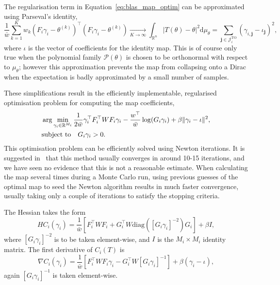 \documentclass[final]{siamltex}
\begin{document}
The regularisation term in Equation~\eqref{eq:blas_map_optim} can be approximated using Parseval's identity,
\[
	\frac{1}{\bar{w}}\sum\limits_{k=1}^K \! w_k
        (F_i\gamma_i-\theta^{(k)})^\top(F_i\gamma_i-\theta^{(k)})
        \xrightarrow[K \to \infty]{}
		\int_{\mathbb{R}^n} |T(\theta)-\theta|^2 \text{d}\mu_\theta =
		\sum\limits_{\mathbf{j}\in\mathcal{J}_i^\text{TO}} (\gamma_{i,\mathbf{j}}-\iota_\mathbf{j})^2,
\]
where $\iota$ is the vector of coefficients for the identity map. This is of course only true when
the polynomial family $\mathcal{P}(\theta)$ is chosen to be orthonormal with respect to $\mu_\theta$; however this
approximation prevents the map from collapsing onto a Dirac when the expectation is badly approximated by a small number of samples.%

These simplifications result in the efficiently implementable, regularised optimisation problem for
computing the map coefficients, 
\begin{align}\label{eq:weighted_map_optim}
	&\arg\min_{\gamma_i\in\mathbb{R}^{M_i}} \frac{1}{2\bar{w}}\gamma_i^\top F_i^\top WF_i\gamma_i -
		\frac{w^\top}{\bar{w}}\log(G_i\gamma_i) + \beta\|\gamma_i-\iota\|^2, \\
	&\text{subject to} \quad G_i\gamma_i > 0. \notag
\end{align}
This optimisation problem can be efficiently solved using Newton iterations. It is suggested
in~\cite{parno2014transport} that this method usually converges in around 10-15 iterations, and we
have seen no evidence that this is not a reasonable estimate. When calculating the map several times
during a Monte Carlo run, using previous guesses of the optimal map to seed the Newton algorithm
results in much faster convergence, usually taking only a couple of iterations to satisfy the stopping
criteria.

The Hessian takes the
form
\begin{equation}\label{eqn:TPAIS_hessian}
	HC_i(\gamma_i) = \frac{1}{\bar{w}}\left[F_i^\top WF_i + G_i^\top
		W\text{diag}([G_i\gamma_i]^{-2})G_i\right] + \beta I,
\end{equation}
where $[G_i\gamma_i]^{-2}$ is to be taken element-wise, and $I$ is the $M_i\times M_i$
identity matrix. The first derivative of $C_i(T)$ is
\[
	\nabla C_i(\gamma_i) = \frac{1}{\bar{w}}\left[F_i^\top WF_i\gamma_i - G_i^\top
		W[G_i\gamma_i]^{-1}\right] + \beta(\gamma_i - \iota),
\]
again $[G_i\gamma_i]^{-1}$ is taken element-wise.
\end{document}

